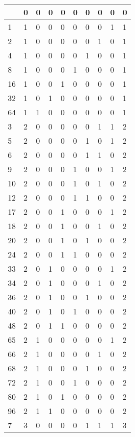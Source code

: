 \documentclass[a4paper,UKenglish]{lipics-v2016}
\begin{document}
\begin{longtable}[c]{|p{}||p{}||p{} p{} p{} p{} p{} p{} p{}|p{}|}
\hline 
\endlastfoot
			0   & 0 & 0 & 0 & 0 & 0 & 0 & 0 & 0 & 0 \\\hline
			1   & 1 & 0 & 0 & 0 & 0 & 0 & 0 & 1 & 1 \\
			2   & 1 & 0 & 0 & 0 & 0 & 0 & 1 & 0 & 1 \\
			4   & 1 & 0 & 0 & 0 & 0 & 1 & 0 & 0 & 1 \\
			8   & 1 & 0 & 0 & 0 & 1 & 0 & 0 & 0 & 1 \\
			16  & 1 & 0 & 0 & 1 & 0 & 0 & 0 & 0 & 1 \\
			32  & 1 & 0 & 1 & 0 & 0 & 0 & 0 & 0 & 1 \\
			64  & 1 & 1 & 0 & 0 & 0 & 0 & 0 & 0 & 1 \\\hline
			3   & 2 & 0 & 0 & 0 & 0 & 0 & 1 & 1 & 2 \\
			5   & 2 & 0 & 0 & 0 & 0 & 1 & 0 & 1 & 2 \\
			6   & 2 & 0 & 0 & 0 & 0 & 1 & 1 & 0 & 2 \\
			9   & 2 & 0 & 0 & 0 & 1 & 0 & 0 & 1 & 2 \\
			10  & 2 & 0 & 0 & 0 & 1 & 0 & 1 & 0 & 2 \\
			12  & 2 & 0 & 0 & 0 & 1 & 1 & 0 & 0 & 2 \\
			17  & 2 & 0 & 0 & 1 & 0 & 0 & 0 & 1 & 2 \\
			18 	& 2 & 0 & 0 & 1 & 0 & 0 & 1 & 0 & 2 \\
			20  & 2 & 0 & 0 & 1 & 0 & 1 & 0 & 0 & 2 \\
			24  & 2 & 0 & 0 & 1 & 1 & 0 & 0 & 0 & 2 \\
			33  & 2 & 0 & 1 & 0 & 0 & 0 & 0 & 1 & 2 \\
			34  & 2 & 0 & 1 & 0 & 0 & 0 & 1 & 0 & 2 \\
			36  & 2 & 0 & 1 & 0 & 0 & 1 & 0 & 0 & 2 \\
			40  & 2 & 0 & 1 & 0 & 1 & 0 & 0 & 0 & 2 \\
			48  & 2 & 0 & 1 & 1 & 0 & 0 & 0 & 0 & 2 \\
			65  & 2 & 1 & 0 & 0 & 0 & 0 & 0 & 1 & 2 \\
			66  & 2 & 1 & 0 & 0 & 0 & 0 & 1 & 0 & 2 \\
			68  & 2 & 1 & 0 & 0 & 0 & 1 & 0 & 0 & 2 \\
			72  & 2 & 1 & 0 & 0 & 1 & 0 & 0 & 0 & 2 \\
			80  & 2 & 1 & 0 & 1 & 0 & 0 & 0 & 0 & 2 \\
			96  & 2 & 1 & 1 & 0 & 0 & 0 & 0 & 0 & 2 \\\hline
			7   & 3 & 0 & 0 & 0 & 0 & 1 & 1 & 1 & 3 \\

\end{longtable}
\end{document}

